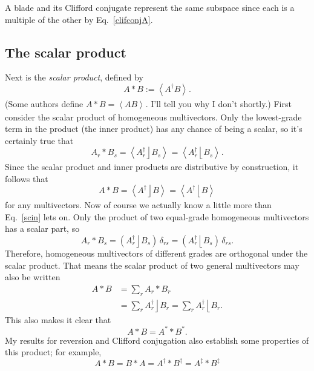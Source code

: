 \documentclass{utarticle}
\DeclareMathOperator{\lin}{\rfloor}
\DeclareMathOperator{\rin}{\lfloor}
\newcommand{\grinv}[2][]{\ensuremath{#2^{*#1}}}
\newcommand{\rev}[1]{\ensuremath{#1^\dagger}}
\newcommand{\clifconj}[1]{\ensuremath{#1^\ddagger}}
\newcommand{\scprod}[2]{\ensuremath{#1 * #2}}
\newcommand{\grade}[2][]{\ensuremath{\left\langle #2 \right\rangle_{#1}}}
\begin{document}
A blade and its Clifford conjugate represent the same subspace since each is a multiple of the 
other by Eq.~\eqref{clifconjA}.

\subsection{The scalar product}
\label{scalarprod}

Next is the \emph{scalar product}, defined by
\begin{equation} \scprod{A}{B} := \grade{\rev{A} B}. \end{equation}
(Some authors define $\scprod{A}{B} = \grade{A B}$.  I'll tell you why 
I don't shortly.)  First consider the scalar product of
homogeneous multivectors.  Only the lowest-grade term in the product (the inner 
product) has any chance of being a scalar, so it's certainly true that
\begin{equation}
\scprod{A_r}{B_s} = \grade{\rev{A_r} \lin B_s} = \grade{\rev{A_r} \rin B_s}.
\label{scin}
\end{equation}
Since the scalar product and inner products are distributive by construction, it 
follows that
\begin{equation}
\scprod{A}{B} = \grade{\rev{A} \lin B} = \grade{\rev{A} \rin B}
\end{equation}
for any multivectors.  Now of course we actually know a little more than Eq.~\eqref{scin} 
lets on.  Only the product of two equal-grade homogeneous multivectors has a scalar 
part, so
\begin{equation}
\scprod{A_r}{B_s} = (\rev{A_r} \lin B_s) \, \delta_{rs} = (\rev{A_r} \rin B_s) \, \delta_{rs}.
\end{equation}
Therefore, homogeneous multivectors of different grades are orthogonal under the 
scalar product.  That means the scalar product of two general multivectors may also be
written
\begin{align}
\scprod{A}{B} & = \sum_r \scprod{A_r}{B_r} \nonumber \\
& = \sum_r \rev{A_r} \lin B_r = \sum_r \rev{A_r} \rin B_r.
\label{scalarproddecomp} 
\end{align}  
This also makes it clear that
\begin{equation} \scprod{A}{B} = \scprod{\grinv{A}}{\grinv{B}}. \label{grinvscprod} \end{equation}
My results for reversion and Clifford conjugation also establish some properties of this product; 
for example,
\begin{equation}
\scprod{A}{B} = \scprod{B}{A} = \scprod{\rev{A}}{\rev{B}} = \scprod{\clifconj{A}}{\clifconj{B}}
\label{revscprod}
\end{equation}
\end{document}

